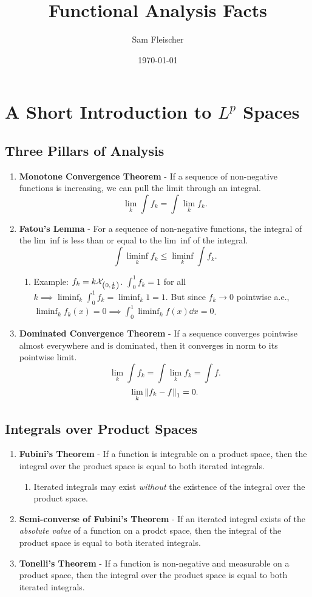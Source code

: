 \documentclass{article}
\title{Functional Analysis Facts}
\author{Sam Fleischer}
\date{\today}
\begin{document}
    \maketitle
    \section{A Short Introduction to $L^p$ Spaces}
    \subsection{Three Pillars of Analysis}
    \begin{enumerate}
        \item \textbf{Monotone Convergence Theorem} - If a sequence of non-negative functions is increasing, we can pull the limit through an integral. $$\lim_k \int f_k = \int \lim_k f_k.$$
        \item \textbf{Fatou's Lemma} - For a sequence of non-negative functions, the integral of the lim~inf is less than or equal to the lim~inf of the integral. $$\int \liminf_k f_k \leq \liminf_k \int f_k.$$
        \begin{enumerate}
            \item Example: $f_k = k\mathcal{X}_{\qty(0, \frac{1}{k})}$.  $\int_0^1 f_k = 1$ for all $k \implies \liminf_k \int_0^1 f_k = \liminf_k 1 = 1$.  But since $f_k \rightarrow 0$ pointwise a.e., $\liminf_k f_k(x) = 0 \implies \int_0^1 \liminf_k f(x) \dd x = 0$.
        \end{enumerate}
        \item \textbf{Dominated Convergence Theorem} - If a sequence converges pointwise almost everywhere and is dominated, then it converges in norm to its pointwise limit.  $$\lim_k\int f_k = \int \lim_k f_k = \int f.$$  $$\lim_k\norm{f_k - f}_1 = 0.$$
    \end{enumerate}

    \subsection{Integrals over Product Spaces}
    \begin{enumerate}
        \item \textbf{Fubini's Theorem} - If a function is integrable on a product space, then the integral over the product space is equal to both iterated integrals.
        \begin{enumerate}
            \item Iterated integrals may exist \emph{without} the existence of the integral over the product space.
        \end{enumerate}
        \item \textbf{Semi-converse of Fubini's Theorem} - If an iterated integral exists of the \emph{absolute value} of a function on a prodct space, then the integral of the product space is equal to both iterated integrals.
        \item \textbf{Tonelli's Theorem} - If a function is non-negative and measurable on a product space, then the integral over the product space is equal to both iterated integrals.
    \end{enumerate}
\end{document}
